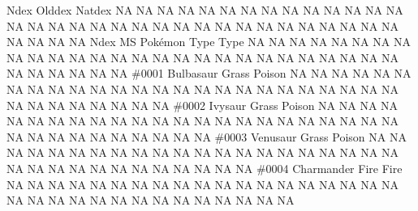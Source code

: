 \documentclass[
]{article}
\begin{document}
Ndex Olddex Natdex \textbar NA \textbar NA \textbar NA \textbar NA
\textbar NA \textbar NA \textbar NA \textbar NA \textbar NA \textbar NA
\textbar NA \textbar NA \textbar NA \textbar NA \textbar NA \textbar NA
\textbar NA \textbar NA \textbar NA \textbar NA \textbar NA \textbar NA
\textbar NA \textbar NA \textbar NA \textbar NA \textbar NA \textbar NA
\textbar NA \textbar NA \textbar NA \textbar NA \textbar NA \textbar NA
\textbar NA \textbar NA \textbar NA \textbar{} \textbar Ndex \textbar MS
\textbar Pokémon \textbar Type \textbar Type \textbar NA \textbar NA
\textbar NA \textbar NA \textbar NA \textbar NA \textbar NA \textbar NA
\textbar NA \textbar NA \textbar NA \textbar NA \textbar NA \textbar NA
\textbar NA \textbar NA \textbar NA \textbar NA \textbar NA \textbar NA
\textbar NA \textbar NA \textbar NA \textbar NA \textbar NA \textbar NA
\textbar NA \textbar NA \textbar NA \textbar NA \textbar NA \textbar NA
\textbar NA \textbar{} \textbar\#0001 \textbar{} \textbar Bulbasaur
\textbar Grass \textbar Poison \textbar NA \textbar NA \textbar NA
\textbar NA \textbar NA \textbar NA \textbar NA \textbar NA \textbar NA
\textbar NA \textbar NA \textbar NA \textbar NA \textbar NA \textbar NA
\textbar NA \textbar NA \textbar NA \textbar NA \textbar NA \textbar NA
\textbar NA \textbar NA \textbar NA \textbar NA \textbar NA \textbar NA
\textbar NA \textbar NA \textbar NA \textbar NA \textbar NA \textbar NA
\textbar{} \textbar\#0002 \textbar{} \textbar Ivysaur \textbar Grass
\textbar Poison \textbar NA \textbar NA \textbar NA \textbar NA
\textbar NA \textbar NA \textbar NA \textbar NA \textbar NA \textbar NA
\textbar NA \textbar NA \textbar NA \textbar NA \textbar NA \textbar NA
\textbar NA \textbar NA \textbar NA \textbar NA \textbar NA \textbar NA
\textbar NA \textbar NA \textbar NA \textbar NA \textbar NA \textbar NA
\textbar NA \textbar NA \textbar NA \textbar NA \textbar NA \textbar{}
\textbar\#0003 \textbar{} \textbar Venusaur \textbar Grass
\textbar Poison \textbar NA \textbar NA \textbar NA \textbar NA
\textbar NA \textbar NA \textbar NA \textbar NA \textbar NA \textbar NA
\textbar NA \textbar NA \textbar NA \textbar NA \textbar NA \textbar NA
\textbar NA \textbar NA \textbar NA \textbar NA \textbar NA \textbar NA
\textbar NA \textbar NA \textbar NA \textbar NA \textbar NA \textbar NA
\textbar NA \textbar NA \textbar NA \textbar NA \textbar NA \textbar{}
\textbar\#0004 \textbar{} \textbar Charmander \textbar Fire
\textbar Fire \textbar NA \textbar NA \textbar NA \textbar NA
\textbar NA \textbar NA \textbar NA \textbar NA \textbar NA \textbar NA
\textbar NA \textbar NA \textbar NA \textbar NA \textbar NA \textbar NA
\textbar NA \textbar NA \textbar NA \textbar NA \textbar NA \textbar NA
\textbar NA \textbar NA \textbar NA \textbar NA \textbar NA \textbar NA
\textbar NA \textbar NA \textbar NA \textbar NA \textbar NA \textbar{}
\end{document}
